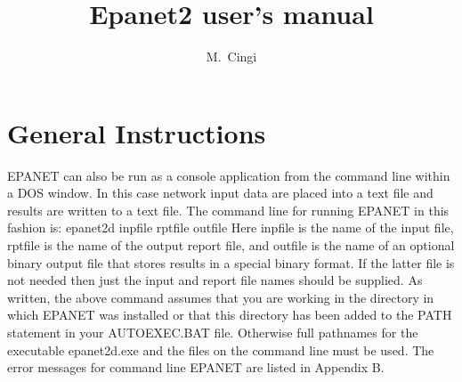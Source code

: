 \documentclass[a4paper,11pt]{Report}
\author{M.~Cingi}
\title{Epanet2 user's manual}
\begin{document}
\maketitle

\tableofcontents

\listoftables


\chapter{General Instructions}

EPANET can also be run as a console application from the command line within a
DOS window. In this case network input data are placed into a text file and results
are written to a text file. The command line for running EPANET in this fashion is:
epanet2d inpfile rptfile outfile
Here inpfile is the name of the input file, rptfile is the name of the output
report file, and outfile is the name of an optional binary output file that stores
results in a special binary format. If the latter file is not needed then just the input and
report file names should be supplied. As written, the above command assumes that
you are working in the directory in which EPANET was installed or that this
directory has been added to the PATH statement in your AUTOEXEC.BAT file.
Otherwise full pathnames for the executable epanet2d.exe and the files on the
command line must be used. The error messages for command line EPANET  are listed in Appendix B.





  


\appendix


\end{document}
